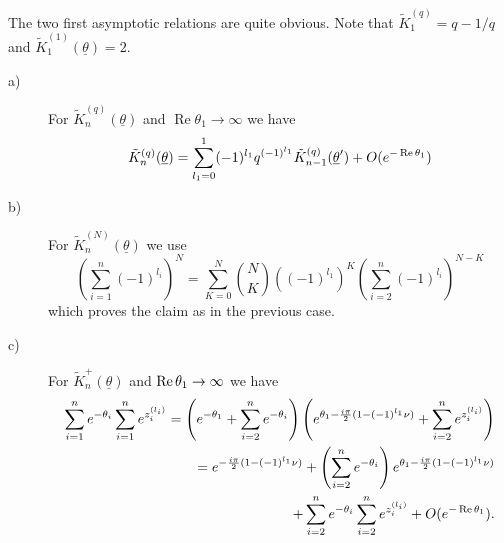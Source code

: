 \documentclass[a4paper,a4paper]{article}
\def\proof{\noindent{\bfseries Proof. }}
\begin{document}
\proof %
The two first asymptotic relations are quite obvious. Note that $\tilde{K}%
_{1}^{(q)}=q-1/q$ and $\tilde{K}_{1}^{(1)}(\underline{\theta })=2$.

\begin{description}
\item[a)]  For $\tilde{K}_{n}^{(q)}(\underline{\theta })$ and $\mathop%
\mathrm{Re}\theta _{1}\rightarrow \infty $ we have 
\[
\tilde{K}_{n}^{(q)}(\underline{\theta })=%
\sum_{l_{1}=0}^{1}(-1)^{l_{1}}q^{(-1)^{l_{1}}}\tilde{K}_{n-1}^{(q)}(%
\underline{\theta }^{\prime })+O(e^{-\mathop{\rm Re}\theta _{1}}) 
\]

\item[b)]  For $\tilde{K}_{n}^{(N)}(\underline{\theta })$ we use 
\[
\left( \sum_{i=1}^{n}(-1)^{l_{i}}\right) ^{N}=\sum_{K=0}^{N}\binom{N}{K}%
\left( (-1)^{l_{1}}\right) ^{K}\left( \sum_{i=2}^{n}(-1)^{l_{i}}\right)
^{N-K} 
\]
which proves the claim as in the previous case.

\item[c)]  For $\tilde{K}_{n}^{+}(\underline{\theta })$ and $\mathop{\rm Re}%
\theta _{1}\rightarrow \infty $ we have 
\begin{align*}
\sum_{i=1}^{n}e^{-\theta _{i}}\sum_{i=1}^{n}e^{z_{i}^{(l_{i})}}=\left(
e^{-\theta _{1}}+\sum_{i=2}^{n}e^{-\theta _{i}}\right) \left( e^{\theta _{1}-%
\frac{i\pi }{2}(1-(-1)^{l_{1}}\nu )}+\sum_{i=2}^{n}e^{z_{i}^{(l_{i})}}\right)
\\
=e^{-\frac{i\pi }{2}(1-(-1)^{l_{1}}\nu )}+\left( \sum_{i=2}^{n}e^{-\theta
_{i}}\right) e^{\theta _{1}-\frac{i\pi }{2}(1-(-1)^{l_{1}}\nu )} \\
+\sum_{i=2}^{n}e^{-\theta _{i}}\sum_{i=2}^{n}e^{z_{i}^{(l_{i})}}+O(e^{-%
\mathop{\rm Re}\theta _{1}}).
\end{align*}
\end{description}
\end{document}
